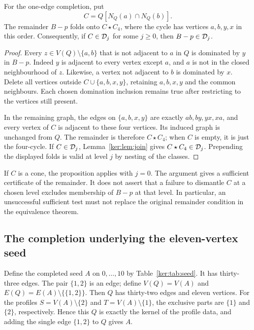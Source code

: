 \begin{proposition}\label{ker:prop:remainder-folds}
For the one-edge completion, put
\[
 C=Q[N_Q(a)\cap N_Q(b)].
\]
The remainder \(B-p\) folds onto \(C\star C_4\), where the cycle
has vertices \(a,b,y,x\) in this order.
Consequently, if \(C\in\mathcal D_j\) for some \(j\geq0\), then
\(B-p\in\mathcal D_j\).
\end{proposition}
\begin{proof}
Every \(z\in V(Q)\setminus\{a,b\}\) that is not adjacent to \(a\) in \(Q\)
is dominated by \(y\) in \(B-p\). Indeed \(y\) is adjacent to
every vertex except \(a\), and \(a\) is not in the closed
neighbourhood of \(z\). Likewise, a vertex not adjacent to \(b\)
is dominated by \(x\).
Delete all vertices outside \(C\cup\{a,b,x,y\}\), retaining
\(a,b,x,y\) and the common neighbours. Each chosen domination
inclusion remains true after restricting to the vertices still
present.

In the remaining graph, the edges on \(\{a,b,x,y\}\) are exactly
\(ab,by,yx,xa\), and every vertex of \(C\) is adjacent to these
four vertices. Its induced graph is unchanged from \(Q\).
The remainder is therefore \(C\star C_4\); when \(C\) is empty,
it is just the four-cycle.
If \(C\in\mathcal D_j\), Lemma~\ref{ker:lem:join} gives
\(C\star C_4\in\mathcal D_j\). Prepending the displayed folds is valid
at level \(j\) by nesting of the classes.
\end{proof}

If \(C\) is a cone, the proposition applies with \(j=0\).
The argument gives a sufficient certificate of the remainder.
It does not assert that a failure to dismantle \(C\) at a chosen
level excludes membership of \(B-p\) at that level.
In particular, an unsuccessful sufficient test must not replace
the original remainder condition in the equivalence theorem.

\subsection{The completion underlying the eleven-vertex seed}

Define the completed seed \(A\) on \(0,\ldots,10\) by
Table~\ref{ker:tab:seed}. It has thirty-three edges.
The pair \(\{1,2\}\) is an edge; define
\(V(Q)=V(A)\) and \(E(Q)=E(A)\setminus\{\{1,2\}\}\).
Then \(Q\) has thirty-two edges and eleven vertices.
For the profiles \(S=V(A)\setminus\{2\}\) and
\(T=V(A)\setminus\{1\}\), the exclusive parts are
\(\{1\}\) and \(\{2\}\), respectively. Hence this \(Q\) is
exactly the kernel of the profile data, and adding the single edge
\(\{1,2\}\) to \(Q\) gives \(A\).

